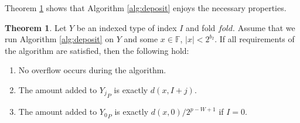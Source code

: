 \documentclass[12pt]{article}
\providecommand{\F}{\ensuremath{\mathbb{F}}}
\theoremstyle{definition}
\newtheorem{thm}{Theorem}[section]
\numberwithin{equation}{section}
\begin{document}
      Theorem \ref{thm:ddeposit} shows that Algorithm \ref{alg:deposit} enjoys the necessary properties.
      \begin{thm}
        Let $Y$ be an indexed type of index $I$ and fold $fold$. Assume that we run Algorithm \ref{alg:deposit} on $Y$ and some $x \in \F$, $|x| < 2^{b_I}$. If all requirements of the algorithm are satisfied, then the following hold:
        \begin{enumerate}
          \item
            No overflow occurs during the algorithm.
          \item
            The amount added to ${Y_j}_P$ is exactly $d(x, I + j)$.
          \item
            The amount added to ${Y_0}_P$ is exactly $d(x, 0)/2^{p - W + 1}$ if $I = 0$.
        \end{enumerate}
        \label{thm:ddeposit}
      \end{thm}
\end{document}
